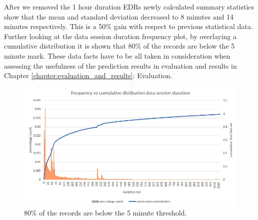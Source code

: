 \documentclass[12pt, a4paper]{report}
\theoremstyle{definition}
\theoremstyle{definition}%
\theoremstyle{definition}%
\theoremstyle{definition}%
\theoremstyle{definition}%
\theoremstyle{definition}%
\begin{document}
After we removed the 1 hour duration EDRs newly calculated summary statistics show that the mean and standard deviation decreased to 8 minutes and 14 minutes respectively. This is a 50\% gain with respect to previous statistical data. Further looking at the data session duration frequency plot, by overlaying a cumulative distribution it is shown that 80\% of the records are below the 5 minute mark. These data facts have to be all taken in consideration when assessing the usefulness of the prediction results in evaluation and results in Chapter \ref{chapter:evaluation_and_results}: Evaluation. 



\begin{table}[h]
	\label{table:summary statistics_02}
	\centering
	\caption{Basic summary statistics of main EDR dataset after removing 1 hour duration EDRs.} 
\end{table}

 
 \begin{figure}
 	\includegraphics[scale=0.75]{data_session_duration.jpg}
 	\centering
 	\caption[Data session duration cummultive distribution]{80\% of the records are below the 5 minute threshold.}
 	\label{fig:data_session_duration}
 \end{figure}
 
\end{document}
